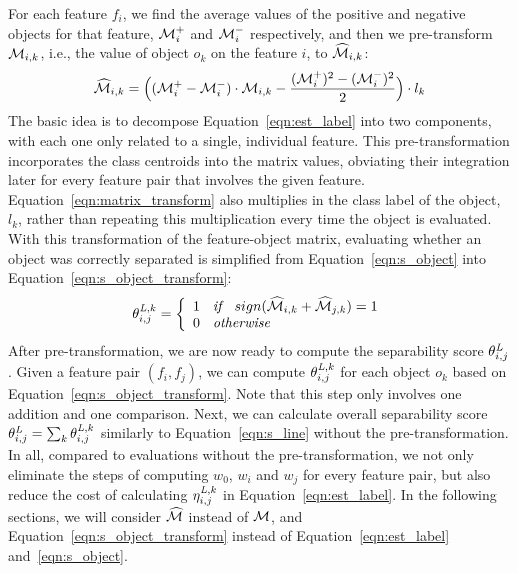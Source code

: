  For each feature $f_i$, we find the average values of the positive and negative objects for that feature, ${\mathcal{M}}_i^+$ and ${\mathcal{M}}_i^-$ respectively, and then we pre-transform ${\mathcal{M}}_{i,k}$, i.e., the value of object $o_k$ on the feature $i$, to $\widehat{{\mathcal{M}}}_{i,k}$:
\begin{equation}\label{eqn:matrix_transform}
\widehat{{\mathcal{M}}}_{i,k} = \Big( ({\mathcal{M}}_i^+-{\mathcal{M}}_i^-)\cdot {\mathcal{M}}_{i,k}-\frac{({\mathcal{M}}_i^+)^2-({\mathcal{M}}_i^-)^2}{2} \Big) \cdot l_k
\end{equation}
\noindent The basic idea is to decompose Equation~\ref{eqn:est_label} into two components, with each one only related to a single, individual feature. This pre-transformation incorporates the class centroids into the matrix values, obviating their integration later for every feature pair that involves the given feature. Equation~\ref{eqn:matrix_transform} also multiplies in the class label of the object, $l_k$, rather than repeating this multiplication every time the object is evaluated. With this transformation of the feature-object matrix, evaluating whether an object was correctly separated is simplified from Equation~\ref{eqn:s_object} into Equation~\ref{eqn:s_object_transform}:
\begin{equation}\label{eqn:s_object_transform}
\theta_{i,j}^{\mathit{L},k}=\left\{
 \begin{array}{ll}
  1 \textit{\hspace{2mm} if \hspace{2mm}} sign(\widehat{{\mathcal{M}}}_{i,k} + \widehat{{\mathcal{M}}}_{j,k}) = 1\\
  0 \textit{\hspace{2mm} otherwise \hspace{2mm}}
 \end{array}
 \right.
\end{equation}
After pre-transformation, we are now ready to compute the separability score $\theta_{i,j}^{\mathit{L}}$. Given a feature pair $(f_i,f_j)$, we can compute $\theta_{i,j}^{\mathit{L},k}$ for each object $o_k$ based on Equation~\ref{eqn:s_object_transform}. Note that this step only involves one addition and one comparison. Next, we can calculate overall separability score $\theta_{i,j}^{\mathit{L}} = \sum_{k}{\theta_{i,j}^{\mathit{L},k}}$ similarly to Equation~\ref{eqn:s_line} without the pre-transformation. In all, compared to evaluations without the pre-transformation, we not only eliminate the steps of computing $w_0$, $w_i$ and $w_j$ for every feature pair, but also reduce the cost of calculating $\eta_{i,j}^{\mathit{L},k}$ in Equation~\ref{eqn:est_label}. In the following sections, we will consider $\widehat{{\mathcal{M}}}$ instead of ${\mathcal{M}}$, and Equation~\ref{eqn:s_object_transform} instead of Equation~\ref{eqn:est_label} and~\ref{eqn:s_object}.
